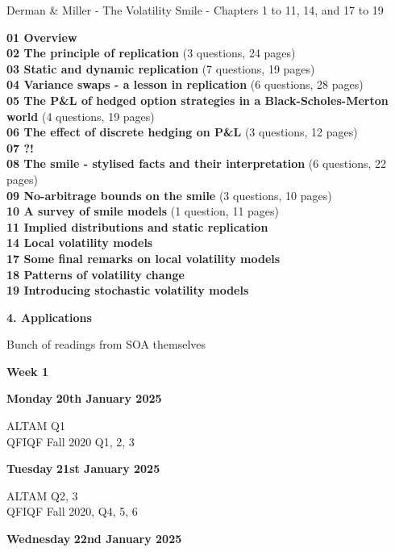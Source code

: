\documentclass[hidelinks, 12pt]{article}
\theoremstyle{mydefstyle}
\theoremstyle{mythmstyle}
\begin{document}
Derman \& Miller - The Volatility Smile - Chapters 1 to 11, 14, and 17 to 19

\textbf{01 Overview} \\
\textbf{02 The principle of replication} (3 questions, 24 pages) \\
\textbf{03 Static and dynamic replication} (7 questions, 19 pages) \\
\textbf{04 Variance swaps - a lesson in replication} (6 questions, 28 pages) \\
\textbf{05 The P\&L of hedged option strategies in a Black-Scholes-Merton world} (4 questions, 19 pages) \\
\textbf{06 The effect of discrete hedging on P\&L} (3 questions, 12 pages) \\
\textbf{07 ?!} \\
\textbf{08 The smile - stylised facts and their interpretation} (6 questions, 22 pages) \\
\textbf{09 No-arbitrage bounds on the smile} (3 questions, 10 pages) \\
\textbf{10 A survey of smile models} (1 question, 11 pages) \\

\textbf{11 Implied distributions and static replication} \\
\textbf{14 Local volatility models} \\
\textbf{17 Some final remarks on local volatility models} \\
\textbf{18 Patterns of volatility change} \\
\textbf{19 Introducing stochastic volatility models}

\begin{center}
\textbf{4. Applications}
\end{center}

Bunch of readings from SOA themselves

\newpage

\begin{center}
\textbf{Week 1}
\end{center}

\textbf{Monday} \hfill \textbf{20th January 2025}

ALTAM Q1 \\
QFIQF Fall 2020 Q1, 2, 3

\textbf{Tuesday} \hfill \textbf{21st January 2025}

ALTAM Q2, 3 \\
QFIQF Fall 2020, Q4, 5, 6

\textbf{Wednesday} \hfill \textbf{22nd January 2025}
\end{document}
